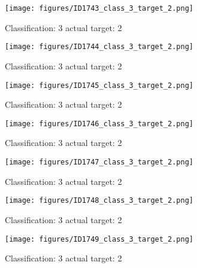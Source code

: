 \begin{figure}[h!]
\begin{center}
\texttt{[image: figures/ID1743\_class\_3\_target\_2.png]}
\end{center}
\caption{ Classification: 3 actual target: 2}
\label{fig:ID1743_class_3_target_2}
\end{figure}
\begin{figure}[h!]
\begin{center}
\texttt{[image: figures/ID1744\_class\_3\_target\_2.png]}
\end{center}
\caption{ Classification: 3 actual target: 2}
\label{fig:ID1744_class_3_target_2}
\end{figure}
\begin{figure}[h!]
\begin{center}
\texttt{[image: figures/ID1745\_class\_3\_target\_2.png]}
\end{center}
\caption{ Classification: 3 actual target: 2}
\label{fig:ID1745_class_3_target_2}
\end{figure}
\begin{figure}[h!]
\begin{center}
\texttt{[image: figures/ID1746\_class\_3\_target\_2.png]}
\end{center}
\caption{ Classification: 3 actual target: 2}
\label{fig:ID1746_class_3_target_2}
\end{figure}
\begin{figure}[h!]
\begin{center}
\texttt{[image: figures/ID1747\_class\_3\_target\_2.png]}
\end{center}
\caption{ Classification: 3 actual target: 2}
\label{fig:ID1747_class_3_target_2}
\end{figure}
\begin{figure}[h!]
\begin{center}
\texttt{[image: figures/ID1748\_class\_3\_target\_2.png]}
\end{center}
\caption{ Classification: 3 actual target: 2}
\label{fig:ID1748_class_3_target_2}
\end{figure}
\begin{figure}[h!]
\begin{center}
\texttt{[image: figures/ID1749\_class\_3\_target\_2.png]}
\end{center}
\caption{ Classification: 3 actual target: 2}
\label{fig:ID1749_class_3_target_2}
\end{figure}
